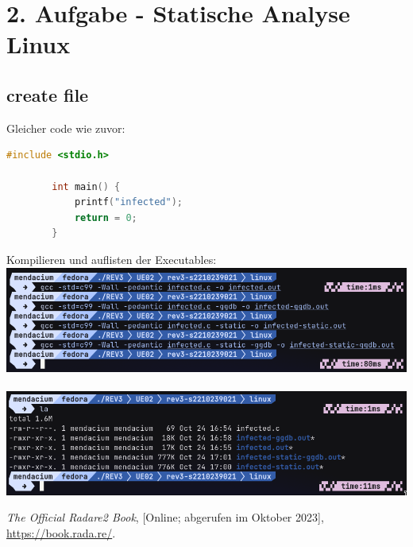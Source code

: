 \documentclass{article}
\begin{document}
	\pagebreak
	
	\section*{2. Aufgabe - Statische Analyse Linux}
	\subsection*{create file}
	Gleicher code wie zuvor:\\
	\begin{lstlisting}[language=c]
		#include <stdio.h>
		
		int main() {
			printf("infected");
			return = 0;
		}
	\end{lstlisting}
	Kompilieren und auflisten der Executables:\\
	\includegraphics[width=0.7\linewidth]{pictures/2. compile files}\\
	\\
	\includegraphics[width=0.5\linewidth]{pictures/2. all files}\\
		
	\begin{thebibliography}{9}
		
		\emph{The Official Radare2 Book},
		[Online; abgerufen im Oktober 2023],
		\url{https://book.rada.re/}.
		
	\end{thebibliography}
	
	
	\label{LastPage}
	
\end{document}
